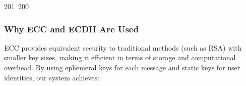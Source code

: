 201~200~\documentclass{article}
\begin{document}
	                                                                                                                                                                                                                                                                                                	                                                                                                                                        	    	                                                                                                	                                                                                                                                                                                                                                                                                                                                	                                                                        	                                                                        	                                                                                                                                        	                                                                                                                                                                        \subsubsection{Why ECC and ECDH Are Used}

	                                                                                                                                                                                                                                                                                                	                                                                                                                                        	    	                                                                                                	                                                                                                                                                                                                                                                                                                                                	                                                                        	                                                                        	                                                                                                                                        	                                                                                                                                                                        ECC provides equivalent security to traditional methods (such as RSA) with smaller key sizes, making it efficient in terms of storage and computational overhead. By using ephemeral keys for each message and static keys for user identities, our system achieves:
\end{document}
